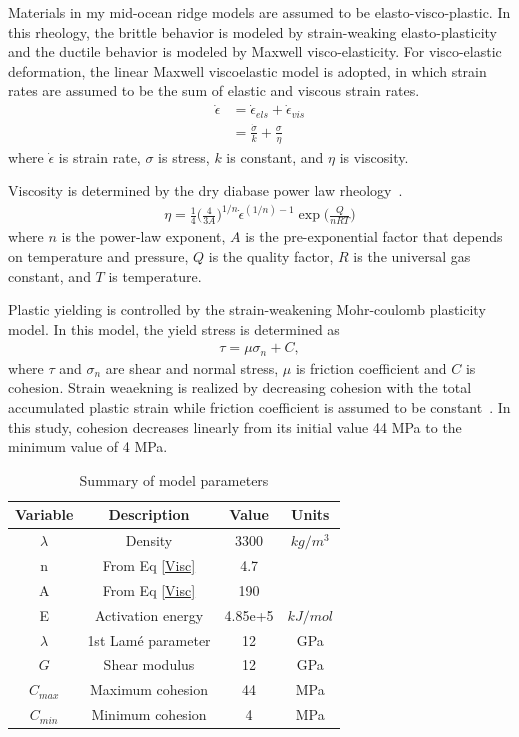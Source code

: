 \documentclass[letterpaper,12pt,notitle]{memphisthesis}                     %
\begin{document}
Materials in my mid-ocean ridge models are assumed to be elasto-visco-plastic. In this rheology, the brittle behavior is modeled by strain-weaking elasto-plasticity and the ductile behavior is modeled by Maxwell visco-elasticity. 
For visco-elastic deformation, the linear Maxwell viscoelastic model is adopted, in which strain rates are assumed to be the sum of elastic and viscous strain rates.
\begin{align} \label{srate}
  \dot{\epsilon} &=  {\dot{\epsilon}}_{els} +  {\dot{\epsilon}}_{vis} \\
                        &= \frac{ \dot{\sigma}}{k} + \frac{\sigma}{\eta}
\end{align}
where $\dot{\epsilon}$ is strain rate, $\sigma$ is stress, $k$ is constant, and $\eta$ is viscosity.

%
Viscosity is determined by the dry diabase power law rheology~\citep{Kirby1987, Chen1990}.
\begin{align} \label{Visc}
 \eta = \frac{1}{4} \bigg( \frac{4}{3A} \bigg)^{1/n} \dot{\epsilon}^{(1/n)-1} \exp\bigg(\frac{Q}{nRT}\bigg)
\end{align}
where $n$ is the power-law exponent, $A$ is the pre-exponential factor that depends on temperature and pressure, $Q$ is the quality factor, $R$ is the universal gas constant, and $T$ is temperature.
%

Plastic yielding is controlled by the strain-weakening Mohr-coulomb plasticity model. In this model, the yield stress is determined as
\begin{align}
 \tau = \mu \sigma_n + C,
\end{align}
where $\tau$ and $\sigma_{n}$ are shear and normal stress, $\mu$ is friction coefficient and $C$ is cohesion.
%
Strain weaekning is realized by decreasing cohesion with the total accumulated plastic strain while friction coefficient is assumed to be constant~\citep{Poliakov1998}. In this study, cohesion decreases linearly from its initial value 44 MPa to the minimum value of 4 MPa.
%
\begin{table}[h!]
	\centering
	\caption{Summary of model parameters}
	\label{tab:modelparams}
	\begin{tabular}{cccc}
		\toprule
		Variable & Description & Value & Units\\
		\midrule
          	$\lambda$ & Density & 3300 & $kg/m^3$\\
	        n & From Eq \ref{Visc} & 4.7 & \\
	        A & From Eq \ref{Visc} & 190 & \\
	        E & Activation energy & 4.85e+5 & $kJ/mol$ \\
	        $\lambda$ & 1st Lam\'e parameter & 12 & GPa\\
	        $G$ & Shear modulus & 12 & GPa\\
	        $C_{max}$ & Maximum cohesion & 44 & MPa\\
	        $C_{min}$ & Minimum cohesion & 4 & MPa\\
		\bottomrule
	\end{tabular}
\end{table}
%
\end{document}
